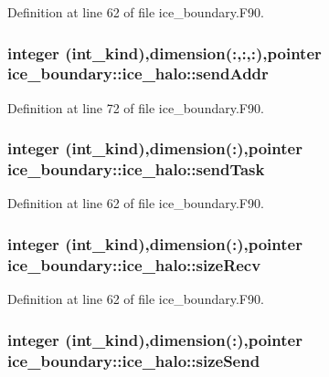 Definition at line 62 of file ice\_\-boundary.F90.\hypertarget{typeice__boundary_1_1ice__halo_a9c316677935c87c4c7a738c7a4a5e69c}{
\subsubsection[{sendAddr}]{\setlength{\rightskip}{0pt plus 5cm}integer (int\_\-kind),dimension(:,:,:),pointer {\bf ice\_\-boundary::ice\_\-halo::sendAddr}}}
\label{typeice__boundary_1_1ice__halo_a9c316677935c87c4c7a738c7a4a5e69c}


Definition at line 72 of file ice\_\-boundary.F90.\hypertarget{typeice__boundary_1_1ice__halo_a77af58ceddef96f27a1d39b92e459db1}{
\subsubsection[{sendTask}]{\setlength{\rightskip}{0pt plus 5cm}integer (int\_\-kind),dimension(:),pointer {\bf ice\_\-boundary::ice\_\-halo::sendTask}}}
\label{typeice__boundary_1_1ice__halo_a77af58ceddef96f27a1d39b92e459db1}


Definition at line 62 of file ice\_\-boundary.F90.\hypertarget{typeice__boundary_1_1ice__halo_ac70cbe1ad58dfe39d1b7083d9dcaf5b1}{
\subsubsection[{sizeRecv}]{\setlength{\rightskip}{0pt plus 5cm}integer (int\_\-kind),dimension(:),pointer {\bf ice\_\-boundary::ice\_\-halo::sizeRecv}}}
\label{typeice__boundary_1_1ice__halo_ac70cbe1ad58dfe39d1b7083d9dcaf5b1}


Definition at line 62 of file ice\_\-boundary.F90.\hypertarget{typeice__boundary_1_1ice__halo_afcdc902a1c162578d137996a3f172684}{
\subsubsection[{sizeSend}]{\setlength{\rightskip}{0pt plus 5cm}integer (int\_\-kind),dimension(:),pointer {\bf ice\_\-boundary::ice\_\-halo::sizeSend}}}
\label{typeice__boundary_1_1ice__halo_afcdc902a1c162578d137996a3f172684}


